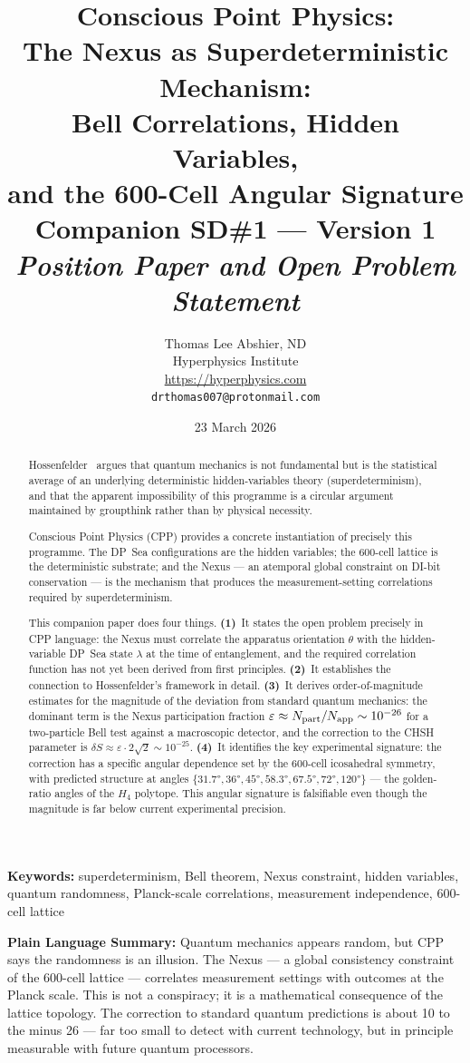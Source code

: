 \documentclass[11pt,letterpaper]{article}
\title{\textbf{Conscious Point Physics:\\
The Nexus as Superdeterministic Mechanism:\\
Bell Correlations, Hidden Variables,\\
and the 600-Cell Angular Signature}\\[6pt]
{\large Companion SD\#1 --- Version 1}\\[4pt]
{\normalsize \textit{Position Paper and Open Problem Statement}}}
\author{Thomas Lee Abshier, ND\\
Hyperphysics Institute\\
\url{https://hyperphysics.com}\\
\texttt{drthomas007@protonmail.com}}
\date{23 March 2026}
\newcommand{\eps}{\varepsilon}
\begin{document}
\maketitle

\begin{abstract}
Hossenfelder~\citep{hossenfelder2024} argues that quantum mechanics is
not fundamental but is the statistical average of an underlying
deterministic hidden-variables theory (superdeterminism), and that
the apparent impossibility of this programme is a circular argument
maintained by groupthink rather than by physical necessity.

Conscious Point Physics (CPP) provides a concrete instantiation of
precisely this programme.  The DP~Sea configurations are the hidden
variables; the 600-cell lattice is the deterministic substrate; and
the Nexus --- an atemporal global constraint on DI-bit conservation ---
is the mechanism that produces the measurement-setting correlations
required by superdeterminism.

This companion paper does four things.
\textbf{(1)}~It states the open problem precisely in CPP language: the
Nexus must correlate the apparatus orientation $\theta$ with the
hidden-variable DP~Sea state $\lambda$ at the time of entanglement,
and the required correlation function has not yet been derived from
first principles.
\textbf{(2)}~It establishes the connection to Hossenfelder's
framework in detail.
\textbf{(3)}~It derives order-of-magnitude estimates for the magnitude
of the deviation from standard quantum mechanics: the dominant term
is the Nexus participation fraction $\eps \approx N_{\rm part} /
N_{\rm app} \sim 10^{-26}$ for a two-particle Bell test against a
macroscopic detector, and the correction to the CHSH parameter is
$\delta S \approx \eps \cdot 2\sqrt{2} \sim 10^{-25}$.
\textbf{(4)}~It identifies the key experimental signature: the
correction has a specific angular dependence set by the 600-cell
icosahedral symmetry, with predicted structure at angles
$\{31.7°, 36°, 45°, 58.3°, 67.5°, 72°, 120°\}$ --- the
golden-ratio angles of the $H_4$ polytope.  This angular signature
is falsifiable even though the magnitude is far below current
experimental precision.
\end{abstract}

\medskip\noindent
\textbf{Keywords:} superdeterminism, Bell theorem, Nexus constraint, hidden variables, quantum randomness, Planck-scale correlations, measurement independence, 600-cell lattice

\bigskip\noindent
\textbf{Plain Language Summary:}
Quantum mechanics appears random, but CPP says the randomness is an illusion. The Nexus --- a global consistency constraint of the 600-cell lattice --- correlates measurement settings with outcomes at the Planck scale. This is not a conspiracy; it is a mathematical consequence of the lattice topology. The correction to standard quantum predictions is about 10 to the minus 26 --- far too small to detect with current technology, but in principle measurable with future quantum processors.
\end{document}
